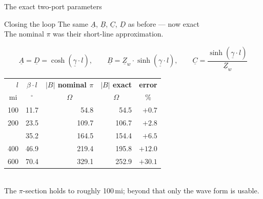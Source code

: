 \begin{frame}{The exact two-port parameters}
  \begin{block}{Closing the loop}
    {The same $\underline{A}$, $\underline{B}$, $\underline{C}$,
    $\underline{D}$ as before --- now exact\\
    The nominal $\pi$ was their short-line approximation.}
  \end{block}

  \vspace{0.4em}
  \setlength{\abovedisplayskip}{3pt}\setlength{\belowdisplayskip}{5pt}
  \[
    \underline{A} = \underline{D} = \cosh\left(\underline{\gamma}\cdot l\right),
    \qquad
    \underline{B} = \underline{Z}_w\cdot\sinh\left(\underline{\gamma}\cdot l\right),
    \qquad
    \underline{C} = \frac{\sinh\left(\underline{\gamma}\cdot l\right)}
                         {\underline{Z}_w}
  \]

  \vspace{0.2em}
  \centering
  \renewcommand{\arraystretch}{1.1}
  {\footnotesize
  \begin{tabular}{@{}r r r r r@{}}
    \textbf{$l$} & \multicolumn{1}{c}{\textbf{$\beta\cdot l$}}
      & \multicolumn{1}{c}{\textbf{$\left|B\right|$ nominal $\pi$}}
      & \multicolumn{1}{c}{\textbf{$\left|B\right|$ exact}}
      & \multicolumn{1}{c}{\textbf{error}} \\
    \multicolumn{1}{c}{mi} & \multicolumn{1}{c}{$^\circ$}
      & \multicolumn{1}{c}{$\Omega$} & \multicolumn{1}{c}{$\Omega$}
      & \multicolumn{1}{c}{\%} \\
    \hline
    100 & 11.7 &  54.8 &  54.5 &  $+0.7$ \\
    200 & 23.5 & 109.7 & 106.7 &  $+2.8$ \\
    \atrowhighlight 300 & 35.2 & 164.5 & 154.4 &  $+6.5$ \\
    400 & 46.9 & 219.4 & 195.8 & $+12.0$ \\
    600 & 70.4 & 329.1 & 252.9 & $+30.1$ \\
    \hline
  \end{tabular}}\\[0.4em]
  {\color{atGray}\footnotesize The $\pi$-section holds to roughly 100\,mi;
  beyond that only the wave form is usable.}
\end{frame}
